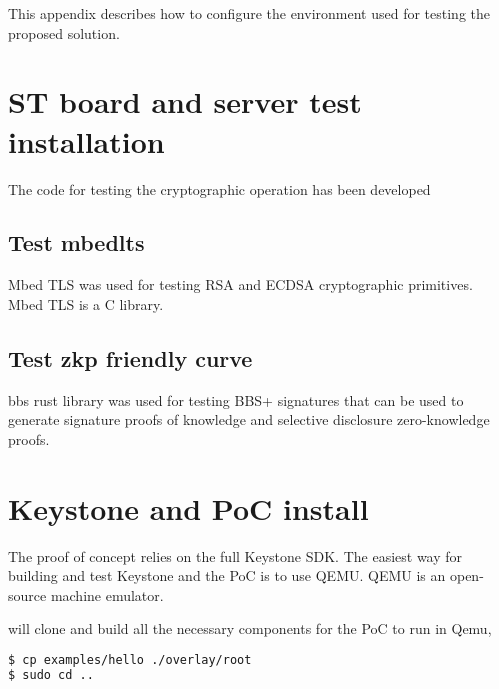 
This appendix describes how to configure the environment used for testing the proposed solution.
\section{ST board and server test installation}
The code for testing the cryptographic operation has been developed 
\subsection*{Test mbedlts}
Mbed TLS was used for testing RSA and ECDSA cryptographic primitives. Mbed TLS is a C library.  

\subsection*{Test zkp friendly curve }
bbs rust library was used for testing BBS+ signatures that can be used to generate signature proofs of knowledge and selective disclosure zero-knowledge proofs.

 
\section{Keystone and PoC install}

The proof of concept relies on the full Keystone SDK. The easiest way for building and test Keystone and the PoC is to use QEMU. QEMU is an open-source machine emulator.

 will clone and build all the necessary components for the PoC to run in Qemu,
\begin{lstlisting}[language=bash]
$ cp examples/hello ./overlay/root
$ sudo cd ..
\end{lstlisting}
